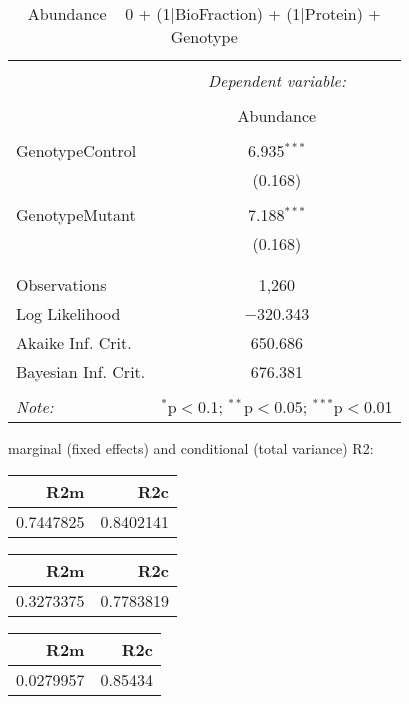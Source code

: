 \documentclass[11pt]{report}
\begin{document}
\begin{table}[!htbp] \centering 
  \caption{Abundance ~ 0 + (1|BioFraction) + (1|Protein) + Genotype} 
  \label{} 
\begin{tabular}{@{\extracolsep{5pt}}lc} 
\\[-1.8ex]\hline 
\hline \\[-1.8ex] 
 & \multicolumn{1}{c}{\textit{Dependent variable:}} \\ 
\cline{2-2} 
\\[-1.8ex] & Abundance \\ 
\hline \\[-1.8ex] 
 GenotypeControl & 6.935$^{***}$ \\ 
  & (0.168) \\ 
  & \\ 
 GenotypeMutant & 7.188$^{***}$ \\ 
  & (0.168) \\ 
  & \\ 
\hline \\[-1.8ex] 
Observations & 1,260 \\ 
Log Likelihood & $-$320.343 \\ 
Akaike Inf. Crit. & 650.686 \\ 
Bayesian Inf. Crit. & 676.381 \\ 
\hline 
\hline \\[-1.8ex] 
\textit{Note:}  & \multicolumn{1}{r}{$^{*}$p$<$0.1; $^{**}$p$<$0.05; $^{***}$p$<$0.01} \\ 
\end{tabular} 
\end{table} 
marginal (fixed effects) and conditional (total variance) R2:

\begin{tabular}{r|r}
\hline
R2m & R2c\\
\hline
0.7447825 & 0.8402141\\
\hline
\end{tabular}

\begin{tabular}{r|r}
\hline
R2m & R2c\\
\hline
0.3273375 & 0.7783819\\
\hline
\end{tabular}

\begin{tabular}{r|r}
\hline
R2m & R2c\\
\hline
0.0279957 & 0.85434\\
\hline
\end{tabular}
\end{document}
